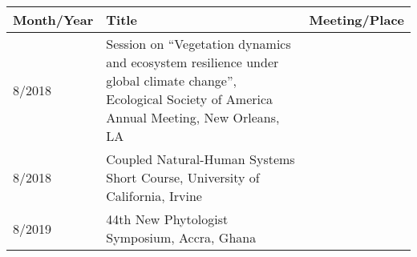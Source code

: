 
\begin{longtable}{lp{10.0cm}p{4.5cm}}
Month/Year & Title & Meeting/Place\\
\hline 
\endhead 
8/2018 & Session on ``Vegetation dynamics and ecosystem resilience under global climate change'', Ecological Society of America Annual Meeting, New Orleans, LA \\
8/2018 & Coupled Natural-Human Systems Short Course, University of California, Irvine \\
8/2019 & 44th New Phytologist Symposium, Accra, Ghana \\
\end{longtable}

